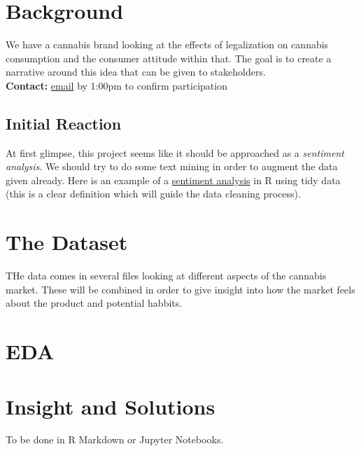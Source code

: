 \documentclass[12pt,a4paper]{book}
\begin{document}
\section{Background}
We have a cannabis brand looking at the effects of legalization on cannabis consumption and the consumer attitude within that. The goal is to create a narrative around this idea that can be given to stakeholders. \\
\textbf{Contact:} \href{mailto:DDLCanada@dentsuaegis.com}{email} by 1:00pm to confirm participation 

\subsection{Initial Reaction}
At first glimpse, this project seems like it should be approached as a \textit{sentiment analysis}. We should try to do some text mining in order to augment the data given already. Here is an example of a \href{https://www.tidytextmining.com/sentiment.html}{sentiment analysis} in R using tidy data (this is a clear definition which will guide the data cleaning process).


\section{The Dataset}
THe data comes in several files looking at different aspects of the cannabis market. These will be combined in order to give insight into how the market feels about the product and potential habbits. 

\section{EDA}

\section{Insight and Solutions}
To be done in R Markdown or Jupyter Notebooks.
\end{document}

